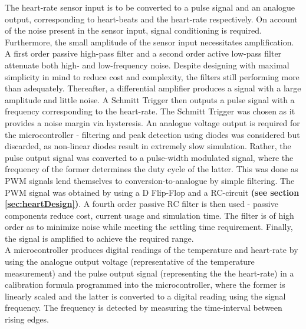
The heart-rate sensor input is to be converted to a pulse signal and an analogue output, corresponding to heart-beats and the heart-rate respectively. On account of the noise present in the sensor input, signal conditioning  is required. Furthermore, the small amplitude of the sensor input necessitates amplification. A first order passive high-pass filter and a second order active low-pass filter attenuate both high- and low-frequency noise. Despite designing with maximal simplicity in mind to reduce cost and complexity, the filters still performing more than adequately. Thereafter, a differential amplifier produces a signal with a large amplitude and little noise. A Schmitt Trigger then outputs a pulse signal with a frequency corresponding to the heart-rate. The Schmitt Trigger was chosen as it provides a noise margin via hysteresis. An analogue voltage output is required for the microcontroller - filtering and peak detection using diodes was considered but discarded, as non-linear diodes result in extremely slow simulation. Rather, the pulse output signal was converted to a pulse-width modulated signal, where the frequency of the former determines the duty cycle of the latter. This was done as PWM signals lend themselves to conversion-to-analogue by simple filtering. The PWM signal was obtained by using a D Flip-Flop and a RC-circuit \textbf{(see section \ref{sec:heartDesign})}. A fourth order passive RC filter is then used - passive components reduce cost, current usage and simulation time. The filter is of high order as to minimize noise while meeting the settling time requirement. Finally, the signal is amplified to achieve the required range.\\

A microcontroller produces digital readings of the temperature and heart-rate by using the analogue output voltage (representative of the temperature measurement) and the pulse output signal (representing the the heart-rate) in a calibration formula programmed into the microcontroller, where the former is linearly scaled and the latter is converted to a digital reading using the signal frequency. The frequency is detected by measuring the time-interval between rising edges.\\

